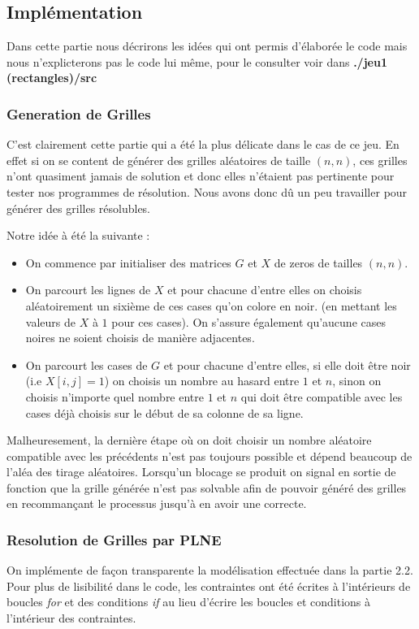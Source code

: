 \documentclass[a4paper,12pt,titlepage,leqno]{article}
\begin{document}
\subsection{Implémentation}
Dans cette partie nous décrirons les idées qui ont permis d'élaborée le code mais nous n'explicterons pas le code lui même, pour le consulter voir dans \textbf{./jeu1 (rectangles)/src}
\subsubsection{Generation de Grilles}
C'est clairement cette partie qui a été la plus délicate dans le cas de ce jeu. En effet si on se content de générer des grilles aléatoires de taille $(n,n)$, ces grilles n'ont quasiment jamais de solution et donc elles n'étaient pas pertinente pour tester nos programmes de résolution. Nous avons donc dû un peu travailler pour générer des grilles résolubles.
\par
Notre idée à été la suivante : 
\begin{itemize}
    \item On commence par initialiser des matrices $G$ et $X$ de zeros de tailles $(n,n)$.
    \item On parcourt les lignes de $X$ et pour chacune d'entre elles on choisis aléatoirement un sixième de ces cases qu'on colore en noir. (en mettant les valeurs de $X$ à $1$ pour ces cases). On s'assure également qu'aucune cases noires ne soient choisis de manière adjacentes.
    \item On parcourt les cases de $G$ et pour chacune d'entre elles, si elle doit être noir (i.e $X[i,j]=1$) on choisis un nombre au hasard entre $1$ et $n$, sinon on choisis n'importe quel nombre entre $1$ et $n$ qui doit être compatible avec les cases déjà choisis sur le début de sa colonne de sa ligne.
\end{itemize}
Malheuresement, la dernière étape où on doit choisir un nombre aléatoire compatible avec les précédents n'est pas toujours possible et dépend beaucoup de l'aléa des tirage aléatoires. Lorsqu'un blocage se produit on signal en sortie de fonction que la grille générée n'est pas solvable afin de pouvoir généré des grilles en recommançant le processus jusqu'à en avoir une correcte.

\subsubsection{Resolution de Grilles par PLNE}
On implémente de façon transparente la modélisation effectuée dans la partie 2.2. Pour plus de lisibilité dans le code, les contraintes ont été écrites à l'intérieurs de boucles \textit{for} et des conditions \textit{if} au lieu d'écrire les boucles et conditions à l'intérieur des contraintes. 
\end{document}
